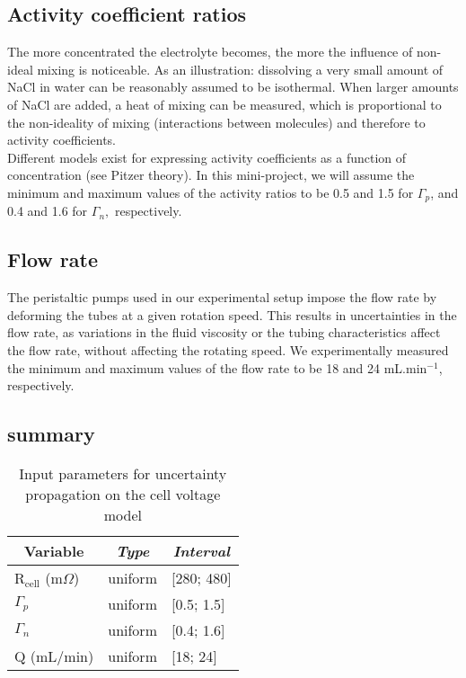 \documentclass[a4paper,12pt]{article} %
\begin{document}
\subsection{Activity coefficient ratios}
The more concentrated the electrolyte becomes, the more the influence of non-ideal mixing is noticeable. As an illustration: dissolving a very small amount of NaCl in water can be reasonably assumed to be isothermal. When larger amounts of NaCl are added, a heat of mixing can be measured, which is proportional to the non-ideality of mixing (interactions between molecules) and therefore to activity coefficients.\\
Different models exist for expressing activity coefficients as a function of concentration (see Pitzer theory). In this mini-project, we will assume the minimum and maximum values of the activity ratios to be 0.5 and 1.5 for $\Gamma_p$, and 0.4 and 1.6 for $\Gamma_n,$ respectively.

\subsection{Flow rate}
The peristaltic pumps used in our experimental setup impose the flow rate by deforming the tubes at a given rotation speed. This results in uncertainties in the flow rate, as variations in the fluid viscosity or the tubing characteristics affect the flow rate, without affecting the rotating speed. We experimentally measured the minimum and maximum values of the flow rate to be 18 and 24 mL.min$^{-1}$, respectively.

\subsection{summary}
\begin{table}[H]
\centering
\begin{tabular}{lll}
\multicolumn{1}{c}{\textbf{Variable}} & \multicolumn{1}{c}{\textit{Type}} & \multicolumn{1}{c}{\textit{Interval}}   \\ \hline
R$_{\text{cell}}$ (m$ \Omega$) & uniform & [280; 480]    \\
$\Gamma_{p}$ & uniform  & [0.5; 1.5]    \\     
$\Gamma_{n}$ & uniform & [0.4; 1.6]     \\  
Q (mL/min)& uniform & [18; 24]    
\end{tabular}
\caption{Input parameters for uncertainty propagation on the cell voltage model}
\label{Input}
\end{table}
\end{document}
